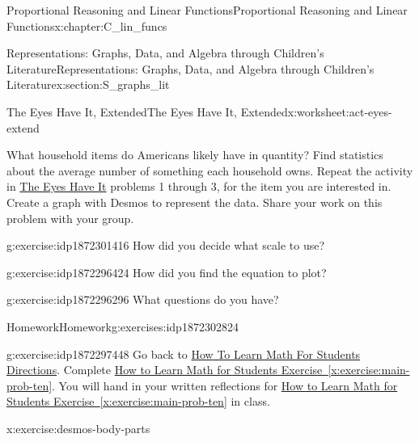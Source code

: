\documentclass[oneside,10pt,]{book}
\newcommand{\xreffont}{\relax}
\numberwithin{equation}{chapter}
\begin{document}
\begin{chapterptx}{Proportional Reasoning and Linear Functions}{}{Proportional Reasoning and Linear Functions}{}{}{x:chapter:C_lin_funcs}
\begin{sectionptx}{Representations: Graphs, Data, and Algebra through Children's Literature}{}{Representations: Graphs, Data, and Algebra through Children's Literature}{}{}{x:section:S_graphs_lit}
\typeout{************************************************}
%
\begin{worksheet-subsection}{The Eyes Have It, Extended}{}{The Eyes Have It, Extended}{}{}{x:worksheet:act-eyes-extend}
\begin{introduction}{}%
What household items do Americans likely have in quantity? Find statistics about the average number of something each household owns. Repeat the activity in \hyperref[x:worksheet:act-eyes]{The Eyes Have It} problems 1 through 3, for the item you are interested in. Create a graph with Desmos to represent the data. Share your work on this problem with your group.%
\end{introduction}%
\begin{divisionexercise}{1}{}{}{g:exercise:idp1872301416}%
How did you decide what scale to use?%
\end{divisionexercise}%
\begin{divisionexercise}{2}{}{}{g:exercise:idp1872296424}%
How did you find the equation to plot?%
\end{divisionexercise}%
\begin{divisionexercise}{3}{}{}{g:exercise:idp1872296296}%
What questions do you have?%
\end{divisionexercise}%
\end{worksheet-subsection}
\restoregeometry
%
%
\typeout{************************************************}
\typeout{************************************************}
%
\begin{exercises-subsection}{Homework}{}{Homework}{}{}{g:exercises:idp1872302824}
\begin{divisionexercise}{1}{}{}{g:exercise:idp1872297448}%
Go back to \hyperlink{x:paragraphs:htlmfs-directions}{How To Learn Math For Students Directions}. Complete \hyperref[x:exercise:main-prob-ten]{How to Learn Math for Students Exercise~{\xreffont\ref{x:exercise:main-prob-ten}}}. You will hand in your written reflections for \hyperref[x:exercise:main-prob-ten]{How to Learn Math for Students Exercise~{\xreffont\ref{x:exercise:main-prob-ten}}} in class.%
\end{divisionexercise}%
\begin{divisionexercise}{2}{}{}{x:exercise:desmos-body-parts}%

\end{divisionexercise}
\end{exercises-subsection}
\end{sectionptx}
\end{chapterptx}
\end{document}
